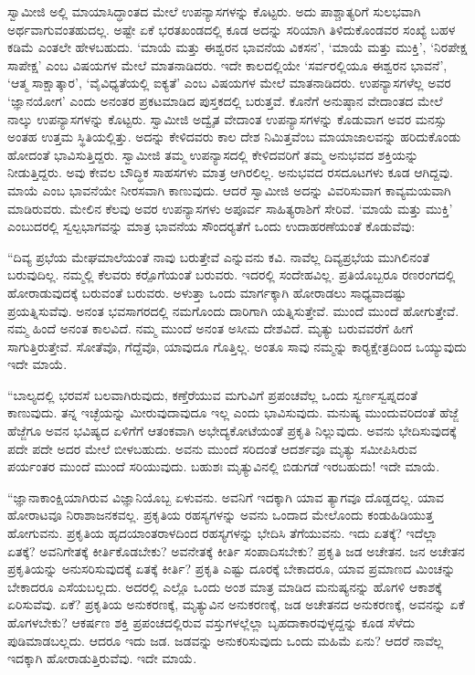  ಸ್ವಾಮೀಜಿ ಅಲ್ಲಿ ಮಾಯಾಸಿದ್ಧಾಂತದ ಮೇಲೆ ಉಪನ್ಯಾಸಗಳನ್ನು ಕೊಟ್ಟರು. ಅದು ಪಾಶ್ಚಾತ್ಯರಿಗೆ ಸುಲಭವಾಗಿ ಅರ್ಥವಾಗುವಂತಹುದಲ್ಲ. ಅಷ್ಟೇ ಏಕೆ ಭರತಖಂಡದಲ್ಲಿ ಕೂಡ ಅದನ್ನು ಸರಿಯಾಗಿ ತಿಳಿದುಕೊಂಡವರ ಸಂಖ್ಯೆ ಬಹಳ ಕಡಿಮೆ ಎಂತಲೇ ಹೇಳಬಹುದು. ‘ಮಾಯೆ ಮತ್ತು ಈಶ್ವರನ ಭಾವನೆಯ ವಿಕಸನ’, ‘ಮಾಯೆ ಮತ್ತು ಮುಕ್ತಿ’, ‘ನಿರಪೇಕ್ಷ ಸಾಪೇಕ್ಷ’ ಎಂಬ ವಿಷಯಗಳ ಮೇಲೆ ಮಾತನಾಡಿದರು. ಇದೇ ಕಾಲದಲ್ಲಿಯೇ ‘ಸರ್ವರಲ್ಲಿಯೂ ಈಶ್ವರನ ಭಾವನೆ’, ‘ಆತ್ಮ ಸಾಕ್ಷಾತ್ಕಾರ’, ‘ವೈವಿಧ್ಯತೆಯಲ್ಲಿ ಐಕ್ಯತೆ’ ಎಂಬ ವಿಷಯಗಳ ಮೇಲೆ ಮಾತನಾಡಿದರು. ಉಪನ್ಯಾಸಗಳೆಲ್ಲ ಅವರ ‘ಜ್ಞಾನಯೋಗ’ ಎಂದು ಅನಂತರ ಪ್ರಕಟಮಾಡಿದ ಪುಸ್ತಕದಲ್ಲಿ ಬರುತ್ತವೆ. ಕೊನೆಗೆ ಅನುಷ್ಠಾನ ವೇದಾಂತದ ಮೇಲೆ ನಾಲ್ಕು ಉಪನ್ಯಾಸಗಳನ್ನು ಕೊಟ್ಟರು. ಸ್ವಾಮೀಜಿ ಅದ್ವೈತ ವೇದಾಂತ ಉಪನ್ಯಾಸಗಳನ್ನು ಕೊಡುವಾಗ ಅವರ ಮನಸ್ಸು ಅಂತಹ ಉತ್ತಮ ಸ್ಥಿತಿಯಲ್ಲಿತ್ತು. ಅದನ್ನು ಕೇಳಿದವರು ಕಾಲ ದೇಶ ನಿಮಿತ್ತವೆಂಬ ಮಾಯಾಜಾಲವನ್ನು ಹರಿದುಕೊಂಡು ಹೋದಂತೆ ಭಾವಿಸುತ್ತಿದ್ದರು. ಸ್ವಾಮೀಜಿ ತಮ್ಮ ಉಪನ್ಯಾಸದಲ್ಲಿ ಕೇಳಿದವರಿಗೆ ತಮ್ಮ ಅನುಭವದ ಶಕ್ತಿಯನ್ನು ನೀಡುತ್ತಿದ್ದರು. ಅವು ಕೇವಲ ಬೌದ್ಧಿಕ ಸಾಹಸಗಳು ಮಾತ್ರ ಆಗಿರಲಿಲ್ಲ. ಅನುಭವದ ರಸದೂಟಗಳು ಕೂಡ ಆಗಿದ್ದವು. ಮಾಯೆ ಎಂಬ ಭಾವನೆಯೇ ನೀರಸವಾಗಿ ಕಾಣುವುದು. ಆದರೆ ಸ್ವಾಮೀಜಿ ಅದನ್ನು ವಿವರಿಸುವಾಗ ಕಾವ್ಯಮಯವಾಗಿ ಮಾಡಿರುವರು. ಮೇಲಿನ ಕೆಲವು ಅವರ ಉಪನ್ಯಾಸಗಳು ಅಪೂರ್ವ ಸಾಹಿತ್ಯರಾಶಿಗೆ ಸೇರಿವೆ. ‘ಮಾಯೆ ಮತ್ತು ಮುಕ್ತಿ’ ಎಂಬುದರಲ್ಲಿ ಸ್ವಲ್ಪಭಾಗವನ್ನು ಮಾತ್ರ ಭಾವನೆಯ ಸೌಂದರ‍್ಯತೆಗೆ ಒಂದು ಉದಾಹರಣೆಯಂತೆ ಕೊಡುವೆವು: 

 “ದಿವ್ಯ ಪ್ರಭೆಯ ಮೇಘಮಾಲೆಯಂತೆ ನಾವು ಬರುತ್ತೇವೆ ಎನ್ನುವನು ಕವಿ. ನಾವೆಲ್ಲ ದಿವ್ಯಪ್ರಭೆಯ ಮುಗಿಲಿನಂತೆ ಬರುವುದಿಲ್ಲ. ನಮ್ಮಲ್ಲಿ ಕೆಲವರು ಕರ‍್ಪೊಗೆ\-ಯಂತೆ ಬರುವರು. ಇದರಲ್ಲಿ ಸಂದೇಹವಿಲ್ಲ. ಪ್ರತಿಯೊಬ್ಬರೂ ರಣರಂಗದಲ್ಲಿ ಹೋರಾಡುವುದಕ್ಕೆ ಬರುವಂತೆ ಬರುವರು. ಅಳುತ್ತಾ ಒಂದು ಮಾರ್ಗಕ್ಕಾಗಿ ಹೋರಾಡಲು ಸಾಧ್ಯವಾದಷ್ಟು ಪ್ರಯತ್ನಿಸುವೆವು. ಅನಂತ ಭವಸಾಗರದಲ್ಲಿ ನಮಗೊಂದು ದಾರಿಗಾಗಿ ಯತ್ನಿಸುತ್ತೇವೆ. ಮುಂದೆ ಮುಂದೆ ಹೋಗುತ್ತೇವೆ. ನಮ್ಮ ಹಿಂದೆ ಅನಂತ ಕಾಲವಿದೆ. ನಮ್ಮ ಮುಂದೆ ಅನಂತ ಅಸೀಮ ದೇಶವಿದೆ. ಮೃತ್ಯು ಬರುವವರೆಗೆ ಹೀಗೆ ಸಾಗುತ್ತಿರುತ್ತೇವೆ. ಸೋತೆವೊ, ಗೆದ್ದೆವೊ, ಯಾವುದೂ ಗೊತ್ತಿಲ್ಲ. ಅಂತೂ ಸಾವು ನಮ್ಮನ್ನು ಕಾರ‍್ಯಕ್ಷೇತ್ರದಿಂದ ಒಯ್ಯುವುದು ಇದೇ ಮಾಯೆ. 

 “ಬಾಲ್ಯದಲ್ಲಿ ಭರವಸೆ ಬಲವಾಗಿರುವುದು, ಕಣ್ತೆರೆಯುವ ಮಗುವಿಗೆ ಪ್ರಪಂಚವೆಲ್ಲ ಒಂದು ಸ್ವರ್ಣಸ್ವಪ್ನದಂತೆ ಕಾಣುವುದು. ತನ್ನ ಇಚ್ಛೆಯನ್ನು ಮೀರುವುದಾವುದೂ ಇಲ್ಲ ಎಂದು ಭಾವಿಸುವುದು. ಮನುಷ್ಯ ಮುಂದುವರಿದಂತೆ ಹೆಜ್ಜೆ ಹೆಜ್ಜೆಗೂ ಅವನ ಭವಿಷ್ಯದ ಏಳಿಗೆಗೆ ಆತಂಕವಾಗಿ ಅಭೇದ್ಯಕೋಟೆಯಂತೆ ಪ್ರಕೃತಿ ನಿಲ್ಲುವುದು. ಅವನು ಭೇದಿಸುವುದಕ್ಕೆ ಪದೇ ಪದೇ ಅದರ ಮೇಲೆ ಬೀಳಬಹುದು. ಅವನು ಮುಂದೆ ಸರಿದಂತೆ ಆದರ್ಶವೂ ಮೃತ್ಯು ಸಮೀಪಿಸಿರುವ ಪರ್ಯಂತರ ಮುಂದೆ ಮುಂದೆ ಸರಿಯುವುದು. ಬಹುಶಃ ಮೃತ್ಯುವಿನಲ್ಲಿ ಬಿಡುಗಡೆ ಇರಬಹುದು! ಇದೇ ಮಾಯೆ. 

 “ಜ್ಞಾನಾಕಾಂಕ್ಷಿಯಾಗಿರುವ ವಿಜ್ಞಾನಿಯೊಬ್ಬ ಏಳುವನು. ಅವನಿಗೆ ಇದಕ್ಕಾಗಿ ಯಾವ ತ್ಯಾಗವೂ ದೊಡ್ಡದಲ್ಲ. ಯಾವ ಹೋರಾಟವೂ ನಿರಾಶಾಜನಕವಲ್ಲ. ಪ್ರಕೃತಿಯ ರಹಸ್ಯಗಳನ್ನು ಅವನು ಒಂದಾದ ಮೇಲೊಂದು ಕಂಡುಹಿಡಿಯುತ್ತ ಹೋಗುವನು. ಪ್ರಕೃತಿಯ ಹೃದಯಾಂತರಾಳದಿಂದ ರಹಸ್ಯಗಳನ್ನು ಭೇದಿಸಿ ತೆಗೆಯುವನು. ಇದು ಏತಕ್ಕೆ? ಇದೆಲ್ಲಾ ಏತಕ್ಕೆ? ಅವನಿಗೇತಕ್ಕೆ ಕೀರ್ತಿಕೊಡಬೇಕು? ಅವನೇತಕ್ಕೆ ಕೀರ್ತಿ ಸಂಪಾದಿಸಬೇಕು? ಪ್ರಕೃತಿ ಜಡ ಅಚೇತನ. ಜನ ಅಚೇತನ ಪ್ರಕೃತಿಯನ್ನು ಅನುಸರಿಸುವುದಕ್ಕೆ ಏತಕ್ಕೆ ಕೀರ್ತಿ? ಪ್ರಕೃತಿ ಎಷ್ಟು ದೂರಕ್ಕೆ ಬೇಕಾದರೂ, ಯಾವ ಪ್ರಮಾಣದ ಮಿಂಚನ್ನು ಬೇಕಾದರೂ ಎಸೆಯಬಲ್ಲದು. ಅದರಲ್ಲಿ ಎಲ್ಲೊ ಒಂದು ಅಂಶ ಮಾತ್ರ ಮಾಡಿದ ಮನುಷ್ಯನನ್ನು ಹೊಗಳಿ ಆಕಾಶಕ್ಕೆ ಏರಿಸುವೆವು. ಏಕೆ? ಪ್ರಕೃತಿಯ ಅನುಕರಣಕ್ಕೆ, ಮೃತ್ಯುವಿನ ಅನುಕರಣಕ್ಕೆ, ಜಡ ಅಚೇತನದ ಅನುಕರಣಕ್ಕೆ, ಅವನನ್ನು ಏಕೆ ಹೊಗಳಬೇಕು? ಆಕರ್ಷಣ ಶಕ್ತಿ ಪ್ರಪಂಚದಲ್ಲಿರುವ ವಸ್ತುಗಳಲ್ಲೆಲ್ಲಾ ಬೃಹದಾಕಾರವುಳ್ಳದ್ದನ್ನು ಕೂಡ ಸೆಳೆದು ಪುಡಿಮಾಡಬಲ್ಲದು. ಆದರೂ ಇದು ಜಡ. ಜಡವನ್ನು ಅನುಕರಿಸುವುದು ಒಂದು ಮಹಿಮೆ ಏನು? ಆದರೆ ನಾವೆಲ್ಲ ಇದಕ್ಕಾಗಿ ಹೋರಾಡುತ್ತಿರುವೆವು. ಇದೇ ಮಾಯೆ. 

